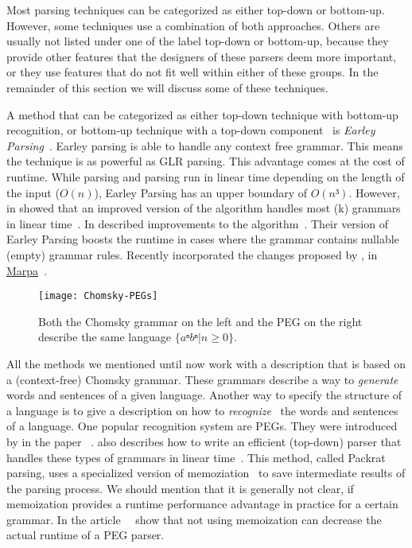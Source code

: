 Most parsing techniques can be categorized as either top-down or bottom-up. However, some techniques use a combination of both approaches. Others are usually not listed under one of the label top-down or bottom-up, because they provide other features that the designers of these parsers deem more important, or they use features that do not fit well within either of these groups. In the remainder of this section we will discuss some of these techniques.

A method that can be categorized as either top-down technique with bottom-up recognition, or bottom-up technique with a top-down component~\cite[p. 206]{grune2008parsing} is \emph{Earley Parsing}~\cite{earley1970efficient}. Earley parsing is able to handle any context free grammar. This means the technique is as powerful as GLR parsing. This advantage comes at the cost of runtime. While  parsing and  parsing run in linear time depending on the length of the input ($O(n)$), Earley Parsing has an upper boundary of $O(n³)$. However, in \citeyear{leo1991general} \citeauthor{leo1991general} showed that an improved version of the algorithm handles most (k) grammars in linear time~\cite{kegler2011marpa, leo1991general}. In \citeyear{aycock2002practical} \citeauthor{aycock2002practical} described improvements to the algorithm~\cite{aycock2002practical}. Their version of Earley Parsing boosts the runtime in cases where the grammar contains nullable (empty) grammar rules. Recently \citeauthor{kegler2011marpa} incorporated the changes proposed by \citeauthor{leo1991general}, \citeauthor{aycock2002practical} in \href{http://savage.net.au/Marpa.html}{Marpa}~\cite{kegler2011marpa}.

\begin{figure}
  \centering
    \texttt{[image: Chomsky-PEGs]}
  \caption{Both the Chomsky grammar on the left and the PEG on the right describe the same language $ \{ aⁿ bⁿ | n ≥ 0 \} $.}
\end{figure}

All the methods we mentioned until now work with a description that is based on a (context-free) Chomsky grammar. These grammars describe a way to \emph{generate} words and sentences of a given language. Another way to specify the structure of a language is to give a description on how to \emph{recognize}~\cite[p. 506]{grune2008parsing} the words and sentences of a language. One popular recognition system are \glspl{PEG}. They were introduced by \citeauthor{ford2004parsing} in the paper ~\cite{ford2004parsing}. \citeauthor{ford2002packrat} also describes how to write an efficient (top-down) parser that handles these types of grammars in linear time~\cite{ford2002packrat}. This method, called Packrat parsing, uses a specialized version of memoziation~\cite[p. 1]{ford2002packrat} to save intermediate results of the parsing process. We should mention that it is generally not clear, if memoization provides a runtime performance advantage in practice for a certain grammar. In the article~~\cite{hudak2008dcgs} \citeauthor{hudak2008dcgs} show that not using memoization can decrease the actual runtime of a PEG parser.

